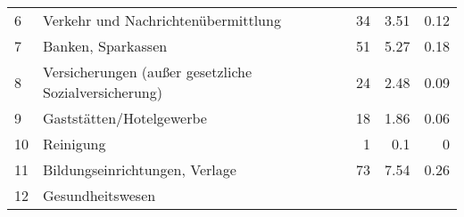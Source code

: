 \begin{longtable}{lXrrr}
     6 &
     \multicolumn{1}{X}{ Verkehr und Nachrichtenübermittlung   } &


       \num{34} &
       \num[round-mode=places,round-precision=2]{3,51} &
         \num[round-mode=places,round-precision=2]{0,12} \\

     7 &
     \multicolumn{1}{X}{ Banken, Sparkassen   } &


       \num{51} &
       \num[round-mode=places,round-precision=2]{5,27} &
         \num[round-mode=places,round-precision=2]{0,18} \\

     8 &
     \multicolumn{1}{X}{ Versicherungen (außer gesetzliche Sozialversicherung)   } &


       \num{24} &
       \num[round-mode=places,round-precision=2]{2,48} &
         \num[round-mode=places,round-precision=2]{0,09} \\

     9 &
     \multicolumn{1}{X}{ Gaststätten/Hotelgewerbe   } &


       \num{18} &
       \num[round-mode=places,round-precision=2]{1,86} &
         \num[round-mode=places,round-precision=2]{0,06} \\

     10 &
     \multicolumn{1}{X}{ Reinigung   } &


       \num{1} &
       \num[round-mode=places,round-precision=2]{0,1} &
         \num[round-mode=places,round-precision=2]{0} \\

     11 &
     \multicolumn{1}{X}{ Bildungseinrichtungen, Verlage   } &


       \num{73} &
       \num[round-mode=places,round-precision=2]{7,54} &
         \num[round-mode=places,round-precision=2]{0,26} \\

     12 &
     \multicolumn{1}{X}{ Gesundheitswesen   } &



\end{longtable}
